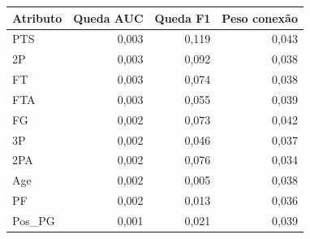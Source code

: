 \begin{tabular}{lrrr}
\toprule
Atributo & Queda AUC & Queda F1 & Peso conexão \\
\midrule
PTS & 0,003 & 0,119 & 0,043 \\
2P & 0,003 & 0,092 & 0,038 \\
FT & 0,003 & 0,074 & 0,038 \\
FTA & 0,003 & 0,055 & 0,039 \\
FG & 0,002 & 0,073 & 0,042 \\
3P & 0,002 & 0,046 & 0,037 \\
2PA & 0,002 & 0,076 & 0,034 \\
Age & 0,002 & 0,005 & 0,038 \\
PF & 0,002 & 0,013 & 0,036 \\
Pos\_PG & 0,001 & 0,021 & 0,039 \\
\bottomrule
\end{tabular}
